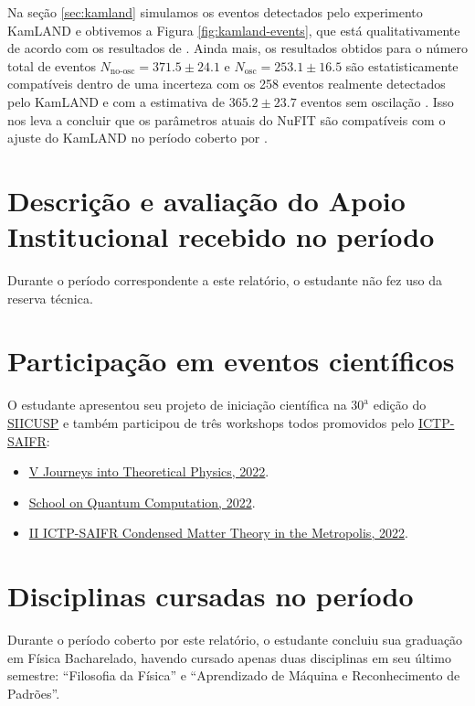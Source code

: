 \documentclass[12pt]{report}
\begin{document}
Na seção \ref{sec:kamland} simulamos os eventos detectados pelo experimento KamLAND e obtivemos a Figura \ref{fig:kamland-events}, que está qualitativamente de acordo com os resultados de \cite{spectral-distortion}. Ainda mais, os resultados obtidos para o número total de eventos $N_{\text{no-osc}} = 371.5 \pm 24.1$ e $N_{\text{osc}} = 253.1 \pm 16.5$ são estatisticamente compatíveis dentro de uma incerteza com os 258 eventos realmente detectados pelo KamLAND e com a estimativa de $365.2 \pm 23.7$ eventos sem oscilação \cite{spectral-distortion}. Isso nos leva a concluir que os parâmetros atuais do NuFIT \cite{nufit} são compatíveis com o ajuste do KamLAND no período coberto por \cite{spectral-distortion}.


\chapter{Descrição e avaliação do Apoio Institucional recebido no período}\label{chp:apoioInst}

Durante o período correspondente a este relatório, o estudante não fez uso da reserva técnica.

\chapter{Participação em eventos científicos}\label{chp:particEvento}

O estudante apresentou seu projeto de iniciação científica na $30^{\text{a}}$ edição do \href{https://siicusp.prp.usp.br/pt/home/}{SIICUSP} e também participou de três workshops todos promovidos pelo \href{https://www.ictp-saifr.org/}{ICTP-SAIFR}:
\begin{itemize}
\item \href{http://journeys.ictp-saifr.org/}{V Journeys into Theoretical Physics, 2022}.
\item \href{https://www.ictp-saifr.org/qc2022/}{School on Quantum Computation, 2022}.
\item \href{https://www.ictp-saifr.org/cmtm2022/}{II ICTP-SAIFR Condensed Matter Theory in the Metropolis, 2022}.
\end{itemize}

\chapter{Disciplinas cursadas no período}

Durante o período coberto por este relatório, o estudante concluiu sua graduação em Física Bacharelado, havendo cursado apenas duas disciplinas em seu último semestre: ``Filosofia da Física'' e ``Aprendizado de Máquina e Reconhecimento de Padrões''.

\pagebreak

%



\end{document}
